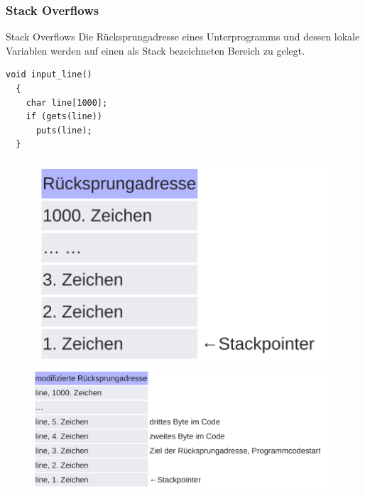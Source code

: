 \documentclass[10pt]{beamer}
\begin{document}
\subsubsection{Stack Overflows}

\begin{frame}[fragile]{Stack Overflows}
 Die R\"ucksprungadresse eines Unterprogramms und dessen lokale Variablen werden auf einen als Stack bezeichneten Bereich zu gelegt.
 \begin{lstlisting}[style=CStyle]
  void input_line()
  {
    char line[1000];
    if (gets(line))
      puts(line);
  }
 \end{lstlisting}

 \begin{figure}%
  \centering
  {\includegraphics[scale=0.10]{stackoverflow}}%
  \quad
  {\includegraphics[scale=0.10]{stackoverflow_2}}%
 \end{figure}
\end{frame}
\end{document}
